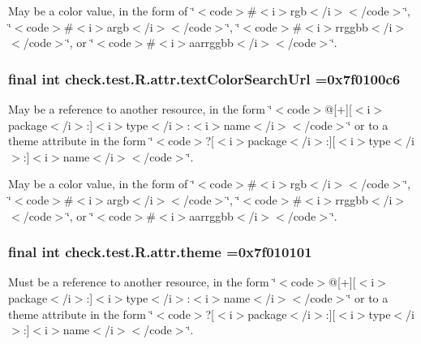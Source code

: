 May be a color value, in the form of \char`\"{}$<$code$>$\#$<$i$>$rgb$<$/i$>$$<$/code$>$\char`\"{}, \char`\"{}$<$code$>$\#$<$i$>$argb$<$/i$>$$<$/code$>$\char`\"{}, \char`\"{}$<$code$>$\#$<$i$>$rrggbb$<$/i$>$$<$/code$>$\char`\"{}, or \char`\"{}$<$code$>$\#$<$i$>$aarrggbb$<$/i$>$$<$/code$>$\char`\"{}. \hypertarget{classcheck_1_1test_1_1_r_1_1attr_a7247a03fccf89e3fef4e08fc3f8ae297}{}
\subsubsection[{text\+Color\+Search\+Url}]{\setlength{\rightskip}{0pt plus 5cm}final int check.\+test.\+R.\+attr.\+text\+Color\+Search\+Url =0x7f0100c6\hspace{0.3cm}{\ttfamily [static]}}\label{classcheck_1_1test_1_1_r_1_1attr_a7247a03fccf89e3fef4e08fc3f8ae297}
May be a reference to another resource, in the form \char`\"{}$<$code$>$@\mbox{[}+\mbox{]}\mbox{[}$<$i$>$package$<$/i$>$\+:\mbox{]}$<$i$>$type$<$/i$>$\+:$<$i$>$name$<$/i$>$$<$/code$>$\char`\"{} or to a theme attribute in the form \char`\"{}$<$code$>$?\mbox{[}$<$i$>$package$<$/i$>$\+:\mbox{]}\mbox{[}$<$i$>$type$<$/i$>$\+:\mbox{]}$<$i$>$name$<$/i$>$$<$/code$>$\char`\"{}. 

May be a color value, in the form of \char`\"{}$<$code$>$\#$<$i$>$rgb$<$/i$>$$<$/code$>$\char`\"{}, \char`\"{}$<$code$>$\#$<$i$>$argb$<$/i$>$$<$/code$>$\char`\"{}, \char`\"{}$<$code$>$\#$<$i$>$rrggbb$<$/i$>$$<$/code$>$\char`\"{}, or \char`\"{}$<$code$>$\#$<$i$>$aarrggbb$<$/i$>$$<$/code$>$\char`\"{}. \hypertarget{classcheck_1_1test_1_1_r_1_1attr_ae33e84d61630420c9ba3073185b3245d}{}
\subsubsection[{theme}]{\setlength{\rightskip}{0pt plus 5cm}final int check.\+test.\+R.\+attr.\+theme =0x7f010101\hspace{0.3cm}{\ttfamily [static]}}\label{classcheck_1_1test_1_1_r_1_1attr_ae33e84d61630420c9ba3073185b3245d}
Must be a reference to another resource, in the form \char`\"{}$<$code$>$@\mbox{[}+\mbox{]}\mbox{[}$<$i$>$package$<$/i$>$\+:\mbox{]}$<$i$>$type$<$/i$>$\+:$<$i$>$name$<$/i$>$$<$/code$>$\char`\"{} or to a theme attribute in the form \char`\"{}$<$code$>$?\mbox{[}$<$i$>$package$<$/i$>$\+:\mbox{]}\mbox{[}$<$i$>$type$<$/i$>$\+:\mbox{]}$<$i$>$name$<$/i$>$$<$/code$>$\char`\"{}. \hypertarget{classcheck_1_1test_1_1_r_1_1attr_a124aa9eea72db03186b6295aebdcfec8}{}
